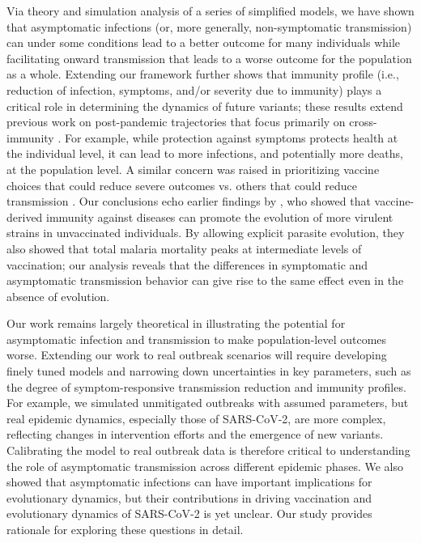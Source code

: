 \documentclass[12pt]{article}
\begin{document}
Via theory and simulation analysis of a series of simplified models, we have shown that asymptomatic infections (or, more generally, non-symptomatic transmission) can under some conditions lead to a better outcome for many individuals while facilitating onward transmission that leads to a worse outcome for the population as a whole.
Extending our framework further shows that immunity profile (i.e., reduction of infection, symptoms, and/or severity due to immunity) plays a critical role in determining the dynamics of future variants;
these results extend previous work on post-pandemic trajectories that focus primarily on cross-immunity \cite{kissler2020projecting,lavine2021immunological}.
For example, while protection against symptoms protects health at the individual level, it can lead to more infections, and potentially more deaths, at the population level.
A similar concern was raised in prioritizing vaccine choices that could reduce severe outcomes vs. others that could reduce transmission \cite{koelle2022changing}.
Our conclusions echo earlier findings by \cite{gandon2001imperfect}, who showed that vaccine-derived immunity against diseases can promote the evolution of more virulent strains in unvaccinated individuals.
By allowing explicit parasite evolution, they also showed that total malaria mortality peaks at intermediate levels of vaccination; our analysis reveals that the differences in symptomatic and asymptomatic transmission behavior can give rise to the same effect even in the absence of evolution.  

Our work remains largely theoretical in illustrating the potential for asymptomatic infection and transmission to make population-level outcomes worse.
Extending our work to real outbreak scenarios will require developing finely tuned models and narrowing down uncertainties in key parameters, such as the degree of symptom-responsive transmission reduction and immunity profiles.
For example, we simulated unmitigated outbreaks with assumed parameters, but real epidemic dynamics, especially those of SARS-CoV-2, are more complex, reflecting changes in intervention efforts and the emergence of new variants.
Calibrating the model to real outbreak data is therefore critical to understanding the role of asymptomatic transmission across different epidemic phases.
We also showed that asymptomatic infections can have important implications for evolutionary dynamics, but their contributions in driving vaccination and evolutionary dynamics of SARS-CoV-2 is yet unclear.
Our study provides rationale for exploring these questions in detail.
\end{document}
